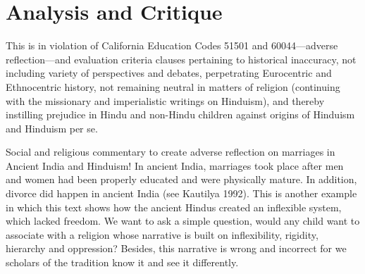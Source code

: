 \section*{Analysis and Critique} 

This is in violation of California Education Codes 51501 and 60044—adverse reflection—and evaluation criteria clauses pertaining to historical inaccuracy, not including variety of perspectives and debates, perpetrating Eurocentric and Ethnocentric history, not remaining neutral in matters of religion (continuing with the missionary and imperialistic writings on Hinduism), and thereby instilling prejudice in Hindu and non-Hindu children against origins of Hinduism and Hinduism per se. 

Social and religious commentary to create adverse reflection on marriages in Ancient India and Hinduism! In ancient India, marriages took place after men and women had been properly educated and were physically mature. In addition, divorce did happen in ancient India (see Kautilya 1992). This is another example in which this text shows how the ancient Hindus created an inflexible system, which lacked freedom. We want to ask a simple question, would any child want to associate with a religion whose narrative is built on inflexibility, rigidity, hierarchy and oppression? Besides, this narrative is wrong and incorrect for we scholars of the tradition know it and see it differently. 
